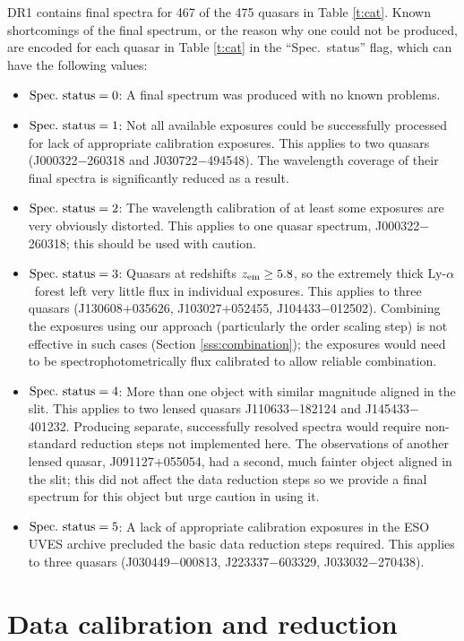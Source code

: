 \documentclass[fleqn,usenatbib,usedcolumn]{mnras}
\newcommand{\Sref}[1]{Section \ref{#1}}
\newcommand{\Tref}[1]{Table \ref{#1}}
\newcommand{\lya}{\ensuremath{\textrm{Ly-}\alpha}}
\newcommand{\zem}{\ensuremath{z_\textrm{\scriptsize em}}}
\begin{document}
DR1 contains final spectra for 467 of the 475 quasars in \Tref{t:cat}. Known shortcomings of the final spectrum, or the reason why one could not be produced, are encoded for each quasar in \Tref{t:cat} in the ``Spec.\ status'' flag, which can have the following values:
\begin{itemize}
\item ${\rm Spec.\ status} = 0$: A final spectrum was produced with no known problems.
\item ${\rm Spec.\ status} = 1$: Not all available exposures could be successfully processed for lack of appropriate calibration exposures. This applies to two quasars (J000322$-$260318 and J030722$-$494548). The wavelength coverage of their final spectra is significantly reduced as a result.
\item ${\rm Spec.\ status} = 2$: The wavelength calibration of at least some exposures are very obviously distorted. This applies to one quasar spectrum, J000322$-$260318; this should be used with caution.
\item ${\rm Spec.\ status} = 3$: Quasars at redshifts $\zem\ge5.8$, so the extremely thick \lya\ forest left very little flux in individual exposures. This applies to three quasars (J130608$+$035626, J103027$+$052455, J104433$-$012502). Combining the exposures using our approach (particularly the order scaling step) is not effective in such cases (\Sref{sss:combination}); the exposures would need to be spectrophotometrically flux calibrated to allow reliable combination.
\item ${\rm Spec.\ status} = 4$: More than one object with similar magnitude aligned in the slit. This applies to two lensed quasars J110633$-$182124 and J145433$-$401232. Producing separate, successfully resolved spectra would require non-standard reduction steps not implemented here. The observations of another lensed quasar, J091127$+$055054, had a second, much fainter object aligned in the slit; this did not affect the data reduction steps so we provide a final spectrum for this object but urge caution in using it.
\item ${\rm Spec.\ status} = 5$: A lack of appropriate calibration exposures in the ESO UVES archive precluded the basic data reduction steps required. This applies to three quasars (J030449$-$000813, J223337$-$603329, J033032$-$270438).
\end{itemize}


\section{Data calibration and reduction}\label{s:reduction}
\end{document}
